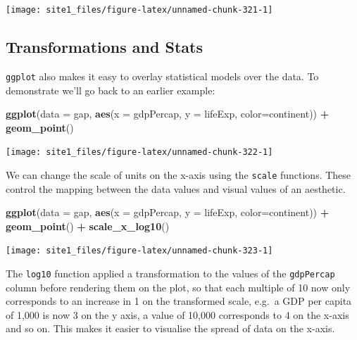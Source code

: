 \documentclass[]{book}
\newenvironment{Shaded}{\begin{snugshade}}{\end{snugshade}}
\newcommand{\KeywordTok}[1]{\textcolor[rgb]{0.13,0.29,0.53}{\textbf{#1}}}
\newcommand{\DataTypeTok}[1]{\textcolor[rgb]{0.13,0.29,0.53}{#1}}
\newcommand{\StringTok}[1]{\textcolor[rgb]{0.31,0.60,0.02}{#1}}
\newcommand{\OperatorTok}[1]{\textcolor[rgb]{0.81,0.36,0.00}{\textbf{#1}}}
\newcommand{\NormalTok}[1]{#1}
\begin{document}
\begin{center}\texttt{[image: site1\_files/figure-latex/unnamed-chunk-321-1]} \end{center}

\subsection{Transformations and Stats}\label{transformations-and-stats}

\texttt{ggplot} also makes it easy to overlay statistical models over
the data. To demonstrate we'll go back to an earlier example:

\begin{Shaded}
\begin{Highlighting}[]
\KeywordTok{ggplot}\NormalTok{(}\DataTypeTok{data =}\NormalTok{ gap, }\KeywordTok{aes}\NormalTok{(}\DataTypeTok{x =}\NormalTok{ gdpPercap, }\DataTypeTok{y =}\NormalTok{ lifeExp, }\DataTypeTok{color=}\NormalTok{continent)) }\OperatorTok{+}\StringTok{ }
\StringTok{  }\KeywordTok{geom_point}\NormalTok{()}
\end{Highlighting}
\end{Shaded}

\begin{center}\texttt{[image: site1\_files/figure-latex/unnamed-chunk-322-1]} \end{center}

We can change the scale of units on the x-axis using the \texttt{scale}
functions. These control the mapping between the data values and visual
values of an aesthetic.

\begin{Shaded}
\begin{Highlighting}[]
\KeywordTok{ggplot}\NormalTok{(}\DataTypeTok{data =}\NormalTok{ gap, }\KeywordTok{aes}\NormalTok{(}\DataTypeTok{x =}\NormalTok{ gdpPercap, }\DataTypeTok{y =}\NormalTok{ lifeExp, }\DataTypeTok{color=}\NormalTok{continent)) }\OperatorTok{+}\StringTok{ }
\StringTok{  }\KeywordTok{geom_point}\NormalTok{() }\OperatorTok{+}\StringTok{ }
\StringTok{  }\KeywordTok{scale_x_log10}\NormalTok{()}
\end{Highlighting}
\end{Shaded}

\begin{center}\texttt{[image: site1\_files/figure-latex/unnamed-chunk-323-1]} \end{center}

The \texttt{log10} function applied a transformation to the values of
the \texttt{gdpPercap} column before rendering them on the plot, so that
each multiple of 10 now only corresponds to an increase in 1 on the
transformed scale, e.g.~a GDP per capita of 1,000 is now 3 on the y
axis, a value of 10,000 corresponds to 4 on the x-axis and so on. This
makes it easier to visualise the spread of data on the x-axis.
\end{document}

